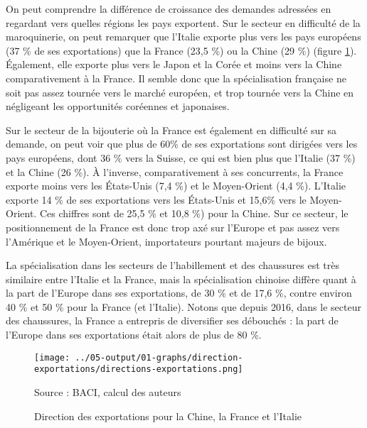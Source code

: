 \documentclass[french,10pt,a4paper]{article}
\begin{document}
\medskip
On peut comprendre la différence de croissance des demandes adressées en regardant vers quelles régions les pays exportent. Sur le secteur en difficulté de la maroquinerie, on peut remarquer que l'Italie exporte plus vers les pays européens (37 \% de ses exportations) que la France (23,5 \%) ou la Chine (29 \%) (figure \ref{fig:direction-exportations}). Également, elle exporte plus vers le Japon et la Corée et moins vers la Chine comparativement à la France. Il semble donc que la spécialisation française ne soit pas assez tournée vers le marché européen, et trop tournée vers la Chine en négligeant les opportunités coréennes et japonaises. 

Sur le secteur de la bijouterie où la France est également en difficulté sur sa demande, on peut voir que plus de 60\% de ses exportations sont dirigées vers les pays européens, dont 36 \% vers la Suisse, ce qui est bien plus que l'Italie (37 \%) et la Chine (26 \%). À l'inverse, comparativement à ses concurrents, la France exporte moins vers les États-Unis (7,4 \%) et le Moyen-Orient (4,4 \%). L'Italie exporte 14 \% de ses exportations vers les États-Unis et 15,6\% vers le Moyen-Orient. Ces chiffres sont de 25,5 \% et 10,8 \%) pour la Chine. Sur ce secteur, le positionnement de la France est donc trop axé sur l'Europe et pas assez vers l'Amérique et le Moyen-Orient, importateurs pourtant majeurs de bijoux.

La spécialisation dans les secteurs de l'habillement et des chaussures est très similaire entre l'Italie et la France, mais la spécialisation chinoise diffère quant à la part de l'Europe dans ses exportations, de 30 \% et de 17,6 \%, contre environ 40 \% et 50 \% pour la France (et l’Italie). Notons que depuis 2016, dans le secteur des chaussures, la France a entrepris de diversifier ses débouchés : la part de l'Europe dans ses exportations était alors de plus de 80 \%. 


\begin{figure}[!h]
  \centering
  \texttt{[image: ../05-output/01-graphs/direction-exportations/directions-exportations.png]}
  \captionsetup{justification=raggedright,singlelinecheck=false, font=small}
  \caption*{Source : BACI, calcul des auteurs}
  \captionsetup{justification=centering, singlelinecheck=true, font=normalsize}
  \caption{Direction des exportations pour la Chine, la France et l'Italie}
  \label{fig:direction-exportations}
\end{figure}
\end{document}
